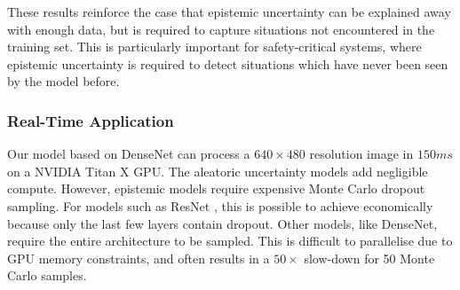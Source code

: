 These results reinforce the case that epistemic uncertainty can be explained away with enough data, but is required to capture situations not encountered in the training set. This is particularly important for safety-critical systems, where epistemic uncertainty is required to detect situations which have never been seen by the model before.






\subsubsection{Real-Time Application}

Our model based on DenseNet \citep{jegou2016one} can process a $640\times480$ resolution image in $150ms$ on a NVIDIA Titan X GPU. The aleatoric uncertainty models add negligible compute. However, epistemic models require expensive Monte Carlo dropout sampling. For models such as ResNet \citep{he2004multiscale}, this is possible to achieve economically because only the last few layers contain dropout. Other models, like DenseNet, require the entire architecture to be sampled. This is difficult to parallelise due to GPU memory constraints, and often results in a $50\times$ slow-down for 50 Monte Carlo samples.

































